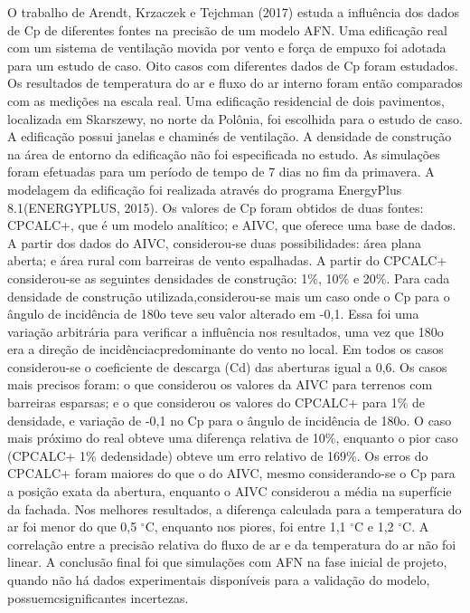 \documentclass[brazil,hardcopy,openany,a5paper]{ufscthesis}
\begin{document}
	O trabalho de Arendt, Krzaczek e Tejchman (2017) estuda a influência dos dados de Cp de diferentes fontes na precisão de um modelo AFN. Uma edificação real com um sistema de ventilação movida por vento e força de empuxo foi adotada para um estudo de caso. Oito casos com diferentes dados de Cp foram estudados. Os resultados de temperatura do ar e fluxo do ar interno foram então comparados com as medições na escala real. Uma edificação residencial de dois pavimentos, localizada em Skarszewy, no norte da Polônia, foi escolhida para o estudo de caso. A edificação possui janelas e chaminés de ventilação. A densidade de construção na área de entorno da edificação não foi especificada no estudo. As simulações foram efetuadas para um período de tempo de 7 dias no fim da primavera. A modelagem da edificação foi realizada através do programa EnergyPlus 8.1(ENERGYPLUS, 2015). Os valores de Cp foram obtidos de duas fontes: CPCALC+, que é um modelo analítico; e AIVC, que oferece uma base de dados. A partir dos dados do AIVC, considerou-se duas possibilidades: área plana aberta; e área rural com barreiras de vento espalhadas. A partir do CPCALC+ considerou-se as seguintes densidades de construção: 1\%, 10\% e 20\%. Para cada densidade de construção utilizada,considerou-se mais um caso onde o Cp para o ângulo de incidência de 180o teve seu valor alterado em -0,1. Essa foi uma variação arbitrária para verificar a influência nos resultados, uma vez que 180o era a direção de incidênciacpredominante do vento no local. Em todos os casos considerou-se o coeficiente de descarga (Cd) das aberturas igual a 0,6. Os casos mais precisos foram: o que considerou os valores da AIVC para terrenos com barreiras esparsas; e o que considerou os valores do CPCALC+ para 1\% de densidade, e variação de -0,1 no Cp para o ângulo de incidência de 180o. O caso mais próximo do real obteve uma diferença relativa de 10\%, enquanto o pior caso (CPCALC+ 1\% dedensidade) obteve um erro relativo de 169\%. Os erros do CPCALC+ foram maiores do que o do AIVC, mesmo considerando-se o Cp para a posição exata da abertura, enquanto o AIVC considerou a média na superfície da fachada. Nos melhores resultados, a diferença calculada para a temperatura do ar foi menor do que 0,5 $^{\circ}$C, enquanto nos piores, foi entre 1,1 $^{\circ}$C e 1,2 $^{\circ}$C. A correlação entre a precisão relativa do fluxo de ar e da temperatura do ar não foi linear. A conclusão final foi que simulações com AFN na fase inicial de projeto, quando não há dados experimentais disponíveis para a validação do modelo, possuemcsignificantes incertezas.
	
\end{document}
